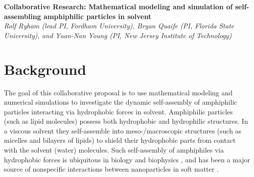 \noindent
{\bf Collaborative Research: Mathematical modeling and simulation of
self-assembling amphiphilic particles in solvent} \\
{\em Rolf Ryham (lead PI, Fordham University), Bryan Quaife (PI,
Florida State University), and Yuan-Nan Young (PI, New Jersey Institute of Technology)}

\section{Background}
\label{sec:background}
The goal of this collaborative proposal is to use mathematical modeling
and numerical simulations to investigate the dynamic self-assembly of
amphiphilic particles interacting via hydrophobic forces
in solvent. Amphiphilic particles (such as lipid molecules) possess
both hydrophobic and hydrophilic structures. In a viscous solvent they
self-assemble into meso-/macroscopic structures (such as micelles and
bilayers of lipids) to shield their hydrophobic parts from contact with
the solvent (water) molecules.
%
%
Such self-assembly of amphiphiles via hydrophobic forces is ubiquitous in biology and biophysics \cite{Israelachvili1954},
and has been a major source of nonspecific interactions between
nanoparticles in soft matter
\cite{Sanchez-IglesiasEtAl2012_ACSNano,AltantzisEtAl2013_PSC,XieYangLuEtAl2020_COCIS}. 



